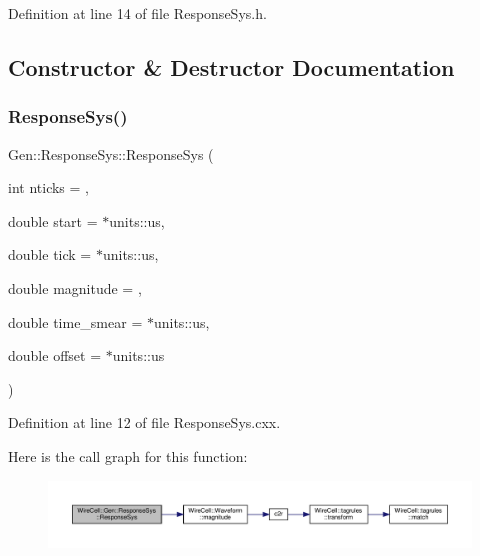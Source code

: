 Definition at line 14 of file Response\+Sys.\+h.



\subsection{Constructor \& Destructor Documentation}
\mbox{\label{class_wire_cell_1_1_gen_1_1_response_sys_a71ff5f000f152ebfe338a15f0d49f0ef}} 
\subsubsection{\texorpdfstring{Response\+Sys()}{ResponseSys()}}
{\footnotesize\ttfamily Gen\+::\+Response\+Sys\+::\+Response\+Sys (\begin{DoxyParamCaption}\item[{int}]{nticks = {},  }\item[{double}]{start = {$\ast$units\+:\+:us},  }\item[{double}]{tick = {$\ast$units\+:\+:us},  }\item[{double}]{magnitude = {},  }\item[{double}]{time\+\_\+smear = {$\ast$units\+:\+:us},  }\item[{double}]{offset = {$\ast$units\+:\+:us} }\end{DoxyParamCaption})}



Definition at line 12 of file Response\+Sys.\+cxx.

Here is the call graph for this function\+:
\nopagebreak
\begin{figure}[H]
\begin{center}
\leavevmode
\includegraphics[width=350pt]{class_wire_cell_1_1_gen_1_1_response_sys_a71ff5f000f152ebfe338a15f0d49f0ef_cgraph}
\end{center}
\end{figure}


